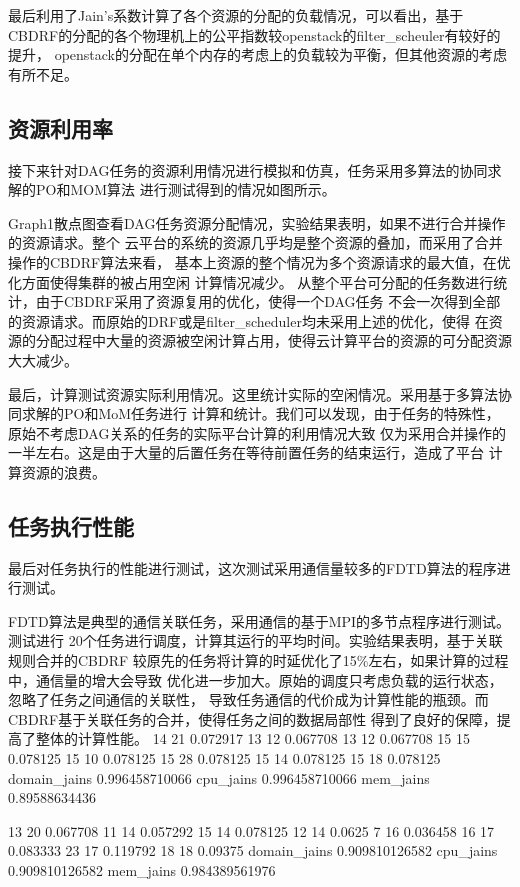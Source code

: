 最后利用了Jain's系数计算了各个资源的分配的负载情况，可以看出，基于
CBDRF的分配的各个物理机上的公平指数较openstack的filter\_scheuler有较好的提升，
openstack的分配在单个内存的考虑上的负载较为平衡，但其他资源的考虑有所不足。

\subsection{资源利用率}
接下来针对DAG任务的资源利用情况进行模拟和仿真，任务采用多算法的协同求解的PO和MOM算法
进行测试得到的情况如图所示。

Graph1散点图查看DAG任务资源分配情况，实验结果表明，如果不进行合并操作的资源请求。整个
云平台的系统的资源几乎均是整个资源的叠加，而采用了合并操作的CBDRF算法来看，
基本上资源的整个情况为多个资源请求的最大值，在优化方面使得集群的被占用空闲
计算情况减少。
从整个平台可分配的任务数进行统计，由于CBDRF采用了资源复用的优化，使得一个DAG任务
不会一次得到全部的资源请求。而原始的DRF或是filter\_scheduler均未采用上述的优化，使得
在资源的分配过程中大量的资源被空闲计算占用，使得云计算平台的资源的可分配资源大大减少。

最后，计算测试资源实际利用情况。这里统计实际的空闲情况。采用基于多算法协同求解的PO和MoM任务进行
计算和统计。我们可以发现，由于任务的特殊性，原始不考虑DAG关系的任务的实际平台计算的利用情况大致
仅为采用合并操作的一半左右。这是由于大量的后置任务在等待前置任务的结束运行，造成了平台
计算资源的浪费。

\subsection{任务执行性能}
最后对任务执行的性能进行测试，这次测试采用通信量较多的FDTD算法的程序进行测试。

FDTD算法是典型的通信关联任务，采用通信的基于MPI的多节点程序进行测试。测试进行
20个任务进行调度，计算其运行的平均时间。实验结果表明，基于关联规则合并的CBDRF
较原先的任务将计算的时延优化了15\%左右，如果计算的过程中，通信量的增大会导致
优化进一步加大。原始的调度只考虑负载的运行状态，忽略了任务之间通信的关联性，
导致任务通信的代价成为计算性能的瓶颈。而CBDRF基于关联任务的合并，使得任务之间的数据局部性
得到了良好的保障，提高了整体的计算性能。
14  21  0.072917
13  12  0.067708
13  12  0.067708
15  15  0.078125
15  10  0.078125
15  28  0.078125
15  14  0.078125
15  18  0.078125
domain_jains 0.996458710066     
cpu_jains 0.996458710066        
mem_jains 0.89588634436     

13  20  0.067708
11  14  0.057292
15  14  0.078125
12  14  0.0625
7   16  0.036458
16  17  0.083333
23  17  0.119792
18  18  0.09375
domain_jains 0.909810126582     
cpu_jains 0.909810126582        
mem_jains 0.984389561976        


